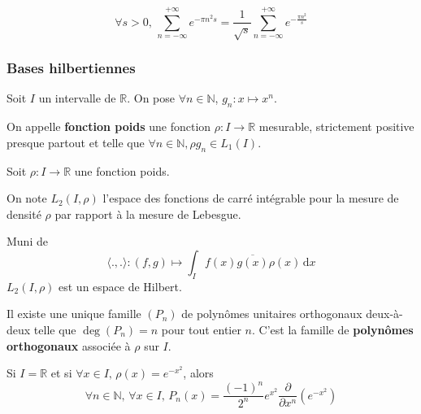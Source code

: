   \begin{application}
    \[ \forall s > 0, \, \sum_{n=-\infty}^{+\infty} e^{-\pi n^2 s} = \frac{1}{\sqrt{s}} \sum_{n=-\infty}^{+\infty} e^{-\frac{\pi n^2}{s}} \]
  \end{application}

  \subsubsection{Bases hilbertiennes}


  Soit $I$ un intervalle de $\mathbb{R}$. On pose $\forall n \in \mathbb{N}$, $g_n : x \mapsto x^n$.

  \begin{definition}
    On appelle \textbf{fonction poids} une fonction $\rho : I \rightarrow \mathbb{R}$ mesurable, strictement positive presque partout et telle que $\forall n \in \mathbb{N}, \rho g_n \in L_1(I)$.
  \end{definition}

  Soit $\rho : I \rightarrow \mathbb{R}$ une fonction poids.

  \begin{notation}
    On note $L_2(I, \rho)$ l'espace des fonctions de carré intégrable pour la mesure de densité $\rho$ par rapport à la mesure de Lebesgue.
  \end{notation}

  \begin{proposition}
    Muni de
    \[ \langle ., . \rangle : (f,g) \mapsto \int_I f(x) \overline{g(x)} \rho(x) \, \mathrm{d}x \]
    $L_2(I, \rho)$ est un espace de Hilbert.
  \end{proposition}

  \begin{theorem}
    Il existe une unique famille $(P_n)$ de polynômes unitaires orthogonaux deux-à-deux telle que $\deg(P_n) = n$ pour tout entier $n$. C'est la famille de \textbf{polynômes orthogonaux} associée à $\rho$ sur $I$.
  \end{theorem}

  \begin{example}
    Si $I = \mathbb{R}$ et si $\forall x \in I, \, \rho(x) = e^{-x^2}$, alors
    \[ \forall n \in \mathbb{N}, \, \forall x \in I, \, P_n(x) = \frac{(-1)^n}{2^n} e^{x^2} \frac{\partial}{\partial x^n} \left( e^{-x^2} \right) \]
  \end{example}

